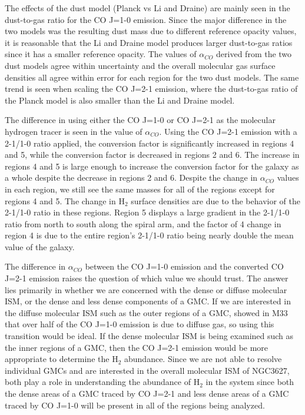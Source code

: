 The effects of the dust model (Planck vs Li and Draine) are mainly seen in the dust-to-gas ratio for the CO J=1-0 emission.  Since the major difference in the two models was the resulting dust mass due to different reference opacity values, it is reasonable that the Li and Draine model produces larger dust-to-gas ratios since it has a smaller reference opacity.  The values of $\alpha_{CO}$ derived from the two dust models agree within uncertainty and the overall molecular gas surface densities all agree within error for each region for the two dust models.  The same trend is seen when scaling the CO J=2-1 emission, where the dust-to-gas ratio of the Planck model is also smaller than the Li and Draine model.  %
  
  The difference in using either the CO J=1-0 or CO J=2-1 as the molecular hydrogen tracer is seen in the value of $\alpha_{CO}$.  Using the CO J=2-1 emission with a 2-1/1-0 ratio applied, the conversion factor is significantly increased in regions 4 and 5, while the conversion factor is decreased in regions 2 and 6.  The increase in regions 4 and 5 is large enough to increase the conversion factor for the galaxy as a whole despite the decrease in regions 2 and 6.  Despite the change in $\alpha_{CO}$ values in each region, we still see the same masses for all of the regions except for regions 4 and 5.  The change in H$_2$ surface densities are due to the behavior of the 2-1/1-0 ratio in these regions.  Region 5 displays a large gradient in the 2-1/1-0 ratio from north to south along the spiral arm, and the factor of 4 change in region 4 is due to the entire region's 2-1/1-0 ratio being nearly double the mean value of the galaxy. 
  
The difference in $\alpha_{CO}$ between the CO J=1-0 emission and the converted CO J=2-1 emission raises the question of which value we should trust.  The answer lies primarily in whether we are concerned with the dense or diffuse molecular ISM, or the dense and less dense components of a GMC.  If we are interested in the diffuse molecular ISM such as the outer regions of a GMC, \cite{wilson1990} showed in M33 that over half of the CO J=1-0 emission is due to diffuse gas, so using this transition would be ideal.  If the dense molecular ISM is being examined such as the inner regions of a GMC, then the CO J=2-1 emission would be more appropriate to determine the H$_2$ abundance.  Since we are not able to resolve individual GMCs and are interested in the overall molecular ISM of NGC3627, both play a role in understanding the abundance of H$_2$ in the system since both the dense areas of a GMC traced by CO J=2-1 and less dense areas of a GMC traced by CO J=1-0 will be present in all of the regions being analyzed.

